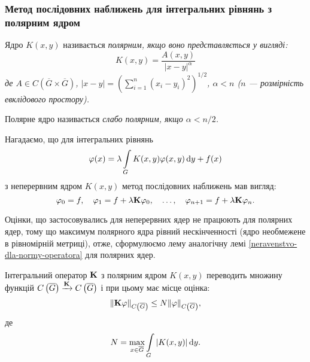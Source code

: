 \subsubsection{Метод послідовних наближень для інтегральних рівнянь з полярним ядром}

\begin{definition}
	Ядро $K(x, y)$ називається \it{полярним}, якщо воно представляється у вигляді:
	\begin{equation}
		K(x, y) = \dfrac{A(x, y)}{|x - y|^\alpha}
	\end{equation}
	де $A \in C\left(\overline G \times \overline G\right)$, $|x - y| = \left( \sum_{i = 1}^n (x_i - y_i)^2 \right)^{1/2}$, $\alpha < n$ ($n$ --- розмірність евклідового простору).
\end{definition}

\begin{definition}
	Полярне ядро називається \it{слабо полярним}, якщо $\alpha < n / 2$.
\end{definition}

Нагадаємо, що для інтегральних рівнянь 
\begin{equation}
	\phi(x) = \lambda \Int_G K(x, y) \phi(x, y) \diff y + f(x)
\end{equation}
з неперервним ядром $K(x, y)$ метод послідовних наближень мав вигляд: 
\begin{equation}
	\phi_0 = f, \quad \phi_1 = f + \lambda \bf{K} \phi_0, \quad \ldots, \quad \phi_{n + 1} = f + \lambda \bf{K} \phi_n.
\end{equation}	

Оцінки, що застосовувались для неперервних ядер не працюють для полярних ядер, тому що максимум полярного ядра рівний нескінченності (ядро необмежене в рівномірній метриці), отже, сформулюємо лему аналогічну лемі \ref{neravenstvo-dla-normy-operatora} для полярних ядер. 

\begin{lemma}
	Інтегральний оператор $\bf{K}$ з полярним ядром $K(x, y)$ переводить множину функцій $C\left(\overline G\right) \xrightarrow{\bf{K}} C \left(\overline G\right)$ і при цьому має місце оцінка: 
	\begin{equation}
		\| \bf{K} \phi \|_{C\left(\overline G\right)} \le N \| \phi\|_{C\left(\overline G\right)},
	\end{equation}
	де 
	\begin{equation}
		N = \Max_{x \in \overline G} \Int_G |K(x, y)| \diff y.
	\end{equation}
\end{lemma}

